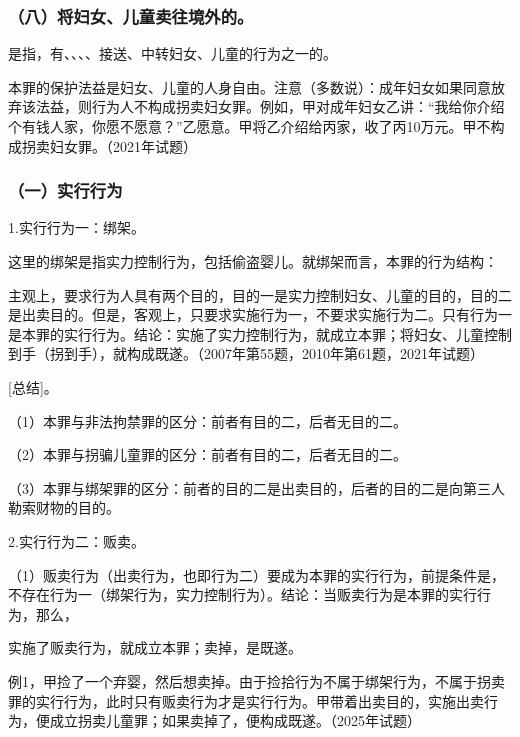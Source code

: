 \subsubsection*{（八）将妇女、儿童卖往境外的。}

是指，有、、、、接送、中转妇女、儿童的行为之一的。

本罪的保护法益是妇女、儿童的人身自由。注意（多数说）：成年妇女如果同意放弃该法益，则行为人不构成拐卖妇女罪。例如，甲对成年妇女乙讲：“我给你介绍个有钱人家，你愿不愿意？”乙愿意。甲将乙介绍给丙家，收了丙10万元。甲不构成拐卖妇女罪。（2021年试题）

\subsubsection*{（一）实行行为}

1.实行行为一：绑架。

这里的绑架是指实力控制行为，包括偷盗婴儿。就绑架而言，本罪的行为结构：


主观上，要求行为人具有两个目的，目的一是实力控制妇女、儿童的目的，目的二是出卖目的。但是，客观上，只要求实施行为一，不要求实施行为二。只有行为一是本罪的实行行为。结论：实施了实力控制行为，就成立本罪；将妇女、儿童控制到手（拐到手），就构成既遂。（2007年第55题，2010年第61题，2021年试题）

[总结]。

（1）本罪与非法拘禁罪的区分：前者有目的二，后者无目的二。

（2）本罪与拐骗儿童罪的区分：前者有目的二，后者无目的二。

（3）本罪与绑架罪的区分：前者的目的二是出卖目的，后者的目的二是向第三人勒索财物的目的。

2.实行行为二：贩卖。

（1）贩卖行为（出卖行为，也即行为二）要成为本罪的实行行为，前提条件是，不存在行为一（绑架行为，实力控制行为）。结论：当贩卖行为是本罪的实行行为，那么，

实施了贩卖行为，就成立本罪；卖掉，是既遂。

例1，甲捡了一个弃婴，然后想卖掉。由于捡拾行为不属于绑架行为，不属于拐卖罪的实行行为，此时只有贩卖行为才是实行行为。甲带着出卖目的，实施出卖行为，便成立拐卖儿童罪；如果卖掉了，便构成既遂。（2025年试题）


